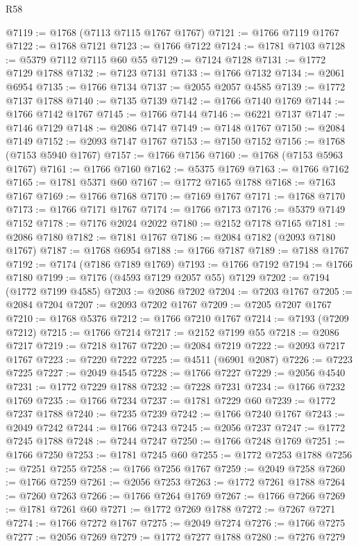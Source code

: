 \begin{lexlean}{R58}
\begin{coremodule}
@7119 := @1768 (@7113 @7115 @1767 @1767)
@7121 := @1766 @7119 @1767
@7122 := @1768 @7121
@7123 := @1766 @7122
@7124 := @1781 @7103
@7128 := @5379 @7112 @7115 @60 @55
@7129 := @7124 @7128
@7131 := @1772 @7129 @1788
@7132 := @7123 @7131
@7133 := @1766 @7132
@7134 := @2061 @6954
@7135 := @1766 @7134
@7137 := @2055 @2057 @4585
@7139 := @1772 @7137 @1788
@7140 := @7135 @7139
@7142 := @1766 @7140 @1769
@7144 := @1766 @7142 @1767
@7145 := @1766 @7144
@7146 := @6221 @7137
@7147 := @7146 @7129
@7148 := @2086 @7147
@7149 := @7148 @1767
@7150 := @2084 @7149
@7152 := @2093 @7147 @1767
@7153 := @7150 @7152
@7156 := @1768 (@7153 @5940 @1767)
@7157 := @1766 @7156
@7160 := @1768 (@7153 @5963 @1767)
@7161 := @1766 @7160
@7162 := @5375 @1769
@7163 := @1766 @7162
@7165 := @1781 @5371 @60
@7167 := @1772 @7165 @1788
@7168 := @7163 @7167
@7169 := @1766 @7168
@7170 := @7169 @1767
@7171 := @1768 @7170
@7173 := @1766 @7171 @1767
@7174 := @1766 @7173
@7176 := @5379 @7149 @7152
@7178 := @7176 @2024 @2022
@7180 := @2152 @7178 @7165
@7181 := @2086 @7180
@7182 := @7181 @1767
@7186 := @2084 @7182 (@2093 @7180 @1767)
@7187 := @1768 @6954
@7188 := @1766 @7187
@7189 := @7188 @1767
@7192 := @7174 (@7186 @7189 @1769)
@7193 := @1766 @7192
@7194 := @1766 @7180
@7199 := @7176 (@4593 @7129 @2057 @55) @7129
@7202 := @7194 (@1772 @7199 @4585)
@7203 := @2086 @7202
@7204 := @7203 @1767
@7205 := @2084 @7204
@7207 := @2093 @7202 @1767
@7209 := @7205 @7207 @1767
@7210 := @1768 @5376
@7212 := @1766 @7210 @1767
@7214 := @7193 (@7209 @7212)
@7215 := @1766 @7214
@7217 := @2152 @7199 @55
@7218 := @2086 @7217
@7219 := @7218 @1767
@7220 := @2084 @7219
@7222 := @2093 @7217 @1767
@7223 := @7220 @7222
@7225 := @4511 (@6901 @2087)
@7226 := @7223 @7225
@7227 := @2049 @4545
@7228 := @1766 @7227
@7229 := @2056 @4540
@7231 := @1772 @7229 @1788
@7232 := @7228 @7231
@7234 := @1766 @7232 @1769
@7235 := @1766 @7234
@7237 := @1781 @7229 @60
@7239 := @1772 @7237 @1788
@7240 := @7235 @7239
@7242 := @1766 @7240 @1767
@7243 := @2049 @7242
@7244 := @1766 @7243
@7245 := @2056 @7237
@7247 := @1772 @7245 @1788
@7248 := @7244 @7247
@7250 := @1766 @7248 @1769
@7251 := @1766 @7250
@7253 := @1781 @7245 @60
@7255 := @1772 @7253 @1788
@7256 := @7251 @7255
@7258 := @1766 @7256 @1767
@7259 := @2049 @7258
@7260 := @1766 @7259
@7261 := @2056 @7253
@7263 := @1772 @7261 @1788
@7264 := @7260 @7263
@7266 := @1766 @7264 @1769
@7267 := @1766 @7266
@7269 := @1781 @7261 @60
@7271 := @1772 @7269 @1788
@7272 := @7267 @7271
@7274 := @1766 @7272 @1767
@7275 := @2049 @7274
@7276 := @1766 @7275
@7277 := @2056 @7269
@7279 := @1772 @7277 @1788
@7280 := @7276 @7279

\end{coremodule}
\end{lexlean}
